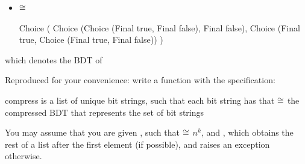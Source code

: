 \documentclass[addpoints,12pt]{exam}
\begin{document}
\begin{questions}
\begin{parts}
\begin{itemize}
      \begin{center}
      \end{center}
      \vspace{5pt}
      \item {} $\cong$
      \begin{codeblock}
        Choice
          ( Choice
              (Choice (Final true, Final false), Final false),
            Choice
              (Final true, Choice (Final true, Final false))
          )
      \end{codeblock}
    \end{itemize}
    which denotes the BDT of
    \begin{center}
    \end{center}

    \newpage

    Reproduced for your convenience: write a function  with the
    specification:

    \spec
      {compress}
      {}
      { is a list of unique bit strings, such that each bit string  has
      that }
      { $\cong$ the compressed BDT that
      represents the set of bit strings }

    You may assume that you are given , such that
     $\cong$ $n^k$, and , which
    obtains the rest of a list after the first element (if possible), and raises an exception otherwise.


\end{parts}
\end{questions}
\end{document}
